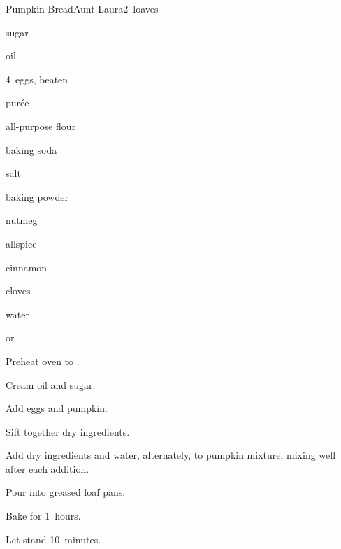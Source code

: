 \begin{recipe}{Pumpkin Bread}{Aunt Laura}{2~loaves}

\begin{ingredients}
\item {} sugar
\item {} oil
\item 4~eggs, beaten
\item {}  purée
\item \C{3\half} all-purpose flour
\item {} baking soda
\item {} salt
\item {} baking powder
\item {} nutmeg
\item {} allspice
\item {} cinnamon
\item \tp{\half} cloves
\item \C{\twothird} water
\item \C{\half}  or 
\end{ingredients}

\begin{directions}
\item Preheat oven to .
\item Cream oil and sugar.
\item Add eggs and pumpkin.
\item Sift together dry ingredients.
\item Add dry ingredients and water, alternately, to pumpkin mixture, mixing well after each addition.
\item Pour into greased loaf pans.
\item Bake for 1\half~hours.
\item Let stand 10~minutes.
\end{directions}

\end{recipe}
